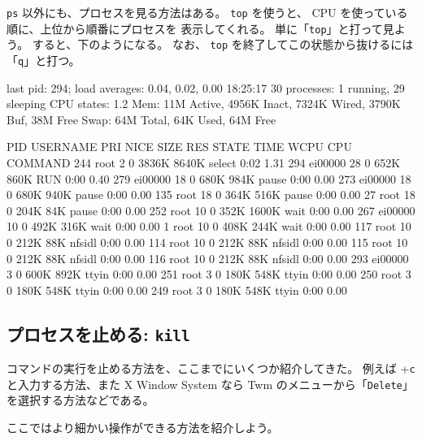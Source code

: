 \texttt{ps} 以外にも、プロセスを見る方法はある。
\texttt{top} を使うと、 CPU を使っている順に、上位から順番にプロセスを
表示してくれる。
単に「\texttt{top}」と打って見よう。
すると、下のようになる。
なお、 \texttt{top} を終了してこの状態から抜けるには「\texttt{q}」と打つ。

\begin{progls}
last pid:   294;  load averages:  0.04,  0.02,  0.00                   18:25:17
30 processes:  1 running, 29 sleeping
CPU states:  1.2%
Mem: 11M Active, 4956K Inact, 7324K Wired, 3790K Buf, 38M Free
Swap: 64M Total, 64K Used, 64M Free

  PID USERNAME PRI NICE SIZE    RES STATE    TIME   WCPU    CPU COMMAND
  244 root      2   0  3836K  8640K select   0:02  1.31%
  294 ei00000  28   0   652K   860K RUN      0:00  0.40%
  279 ei00000  18   0   680K   984K pause    0:00  0.00%
  273 ei00000  18   0   680K   940K pause    0:00  0.00%
  135 root     18   0   364K   516K pause    0:00  0.00%
   27 root     18   0   204K    84K pause    0:00  0.00%
  252 root     10   0   352K  1600K wait     0:00  0.00%
  267 ei00000  10   0   492K   316K wait     0:00  0.00%
    1 root     10   0   408K   244K wait     0:00  0.00%
  117 root     10   0   212K    88K nfsidl   0:00  0.00%
  114 root     10   0   212K    88K nfsidl   0:00  0.00%
  115 root     10   0   212K    88K nfsidl   0:00  0.00%
  116 root     10   0   212K    88K nfsidl   0:00  0.00%
  293 ei00000   3   0   600K   892K ttyin    0:00  0.00%
  251 root      3   0   180K   548K ttyin    0:00  0.00%
  250 root      3   0   180K   548K ttyin    0:00  0.00%
  249 root      3   0   180K   548K ttyin    0:00  0.00%
\end{progls}


\subsection{プロセスを止める: \texttt{kill}}

コマンドの実行を止める方法を、ここまでにいくつか紹介してきた。
例えば +\texttt{c} と入力する方法、また X Window System なら
Twm のメニューから「\texttt{Delete}」を選択する方法などである。

ここではより細かい操作ができる方法を紹介しよう。

